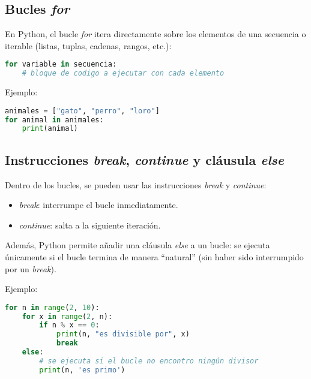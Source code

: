 
\subsection*{Bucles \textit{for}}

En Python, el bucle \textit{for} itera directamente sobre los elementos 
de una secuencia o iterable (listas, tuplas, cadenas, rangos, etc.):

\begin{lstlisting}[language=Python, caption={Estructura de bucle for.}]
for variable in secuencia:
    # bloque de codigo a ejecutar con cada elemento
\end{lstlisting}

Ejemplo:

\begin{lstlisting}[language=Python, caption={Ejemplo de bucle for.}]
animales = ["gato", "perro", "loro"]
for animal in animales:
    print(animal)
\end{lstlisting}

\subsection*{Instrucciones \textit{break}, \textit{continue} y cláusula \textit{else}}

Dentro de los bucles, se pueden usar las instrucciones \textit{break} 
y \textit{continue}:

\begin{itemize}
  \item \textit{break}: interrumpe el bucle inmediatamente.
  \item \textit{continue}: salta a la siguiente iteración.
\end{itemize}

Además, Python permite añadir una cláusula \textit{else} a un bucle:  
se ejecuta únicamente si el bucle termina de manera “natural” 
(sin haber sido interrumpido por un \textit{break}).

Ejemplo:

\begin{lstlisting}[language=Python, caption={Uso de break, continue y else en bucles.}]
for n in range(2, 10):
    for x in range(2, n):
        if n % x == 0:
            print(n, "es divisible por", x)
            break
    else:
        # se ejecuta si el bucle no encontro ningún divisor
        print(n, 'es primo')
\end{lstlisting}

